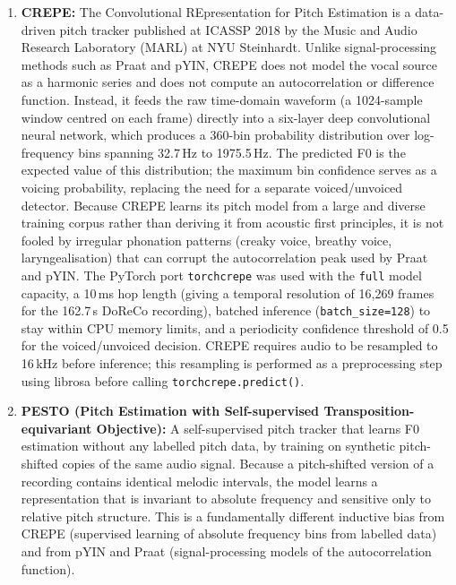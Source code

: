\begin{enumerate}
\item \textbf{CREPE:} The Convolutional REpresentation for Pitch Estimation
      \cite{kim2018crepe} is a data-driven pitch tracker published at ICASSP 2018
      by the Music and Audio Research Laboratory (MARL) at NYU Steinhardt. Unlike
      signal-processing methods such as Praat and pYIN, CREPE does not model the
      vocal source as a harmonic series and does not compute an autocorrelation or
      difference function. Instead, it feeds the raw time-domain waveform (a
      1024-sample window centred on each frame) directly into a six-layer deep
      convolutional neural network, which produces a 360-bin probability
      distribution over log-frequency bins spanning 32.7\,Hz to 1975.5\,Hz. The
      predicted F0 is the expected value of this distribution; the maximum bin
      confidence serves as a voicing probability, replacing the need for a
      separate voiced/unvoiced detector. Because CREPE learns its pitch model
      from a large and diverse training corpus rather than deriving it from
      acoustic first principles, it is not fooled by irregular phonation patterns
      (creaky voice, breathy voice, laryngealisation) that can corrupt the
      autocorrelation peak used by Praat and pYIN. The PyTorch port
      \texttt{torchcrepe} \cite{morrisonTorchcrepe} was used with the
      \texttt{full} model capacity, a 10\,ms hop length (giving a temporal
      resolution of 16,269 frames for the 162.7\,s DoReCo recording), batched
      inference (\texttt{batch\_size=128}) to stay within CPU memory limits, and a
      periodicity confidence threshold of 0.5 for the voiced/unvoiced decision.
      CREPE requires audio to be resampled to 16\,kHz before inference; this
      resampling is performed as a preprocessing step using librosa before
      calling \texttt{torchcrepe.predict()}.


\item \textbf{PESTO (Pitch Estimation with Self-supervised Transposition-equivariant
      Objective):} A self-supervised pitch tracker \cite{riou2023pesto} that learns
      F0 estimation without any labelled pitch data, by training on synthetic
      pitch-shifted copies of the same audio signal. Because a pitch-shifted version
      of a recording contains identical melodic intervals, the model learns a
      representation that is invariant to absolute frequency and sensitive only to
      relative pitch structure. This is a fundamentally different inductive bias from
      CREPE (supervised learning of absolute frequency bins from labelled data) and
      from pYIN and Praat (signal-processing models of the autocorrelation function).


\end{enumerate}
